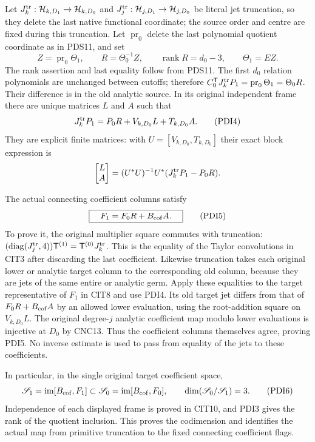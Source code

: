 \documentclass[10pt]{article}
\begin{document}
Let $J_k^{\rm tr}:\mathcal H_{k,D_1}\to\mathcal H_{k,D_0}$ and
$J_j^{\rm tr}:\mathcal H_{j,D_1}\to\mathcal H_{j,D_0}$ be literal jet
truncation, so they delete the last native functional coordinate;
the source order and centre are fixed during this truncation.
Let $\operatorname{pr}_0$ delete the last polynomial quotient
coordinate as in PDS11, and set
\[
 Z=\operatorname{pr}_0\Theta_1,\qquad
 R=\Theta_0^{-1}Z,\qquad
 \operatorname{rank}R=d_0-3,\qquad
 \Theta_1=EZ .
 \tag{PDI3}
\]
The rank assertion and last equality follow from PDS11. The
first $d_0$ relation polynomials are unchanged between cutoffs;
therefore
$C_0^{\mathsf T}J_k^{\rm tr}P_1=\operatorname{pr}_0\Theta_1=\Theta_0R$.
Their difference is in the old analytic source. In its original
independent frame there are unique matrices $L$ and $A$ such that
\[
 J_k^{\rm tr}P_1=P_0R+V_{k,D_0}L+T_{k,D_0}A .
 \tag{PDI4}
\]
They are explicit finite matrices: with
$U=[V_{k,D_0},T_{k,D_0}]$ their exact block expression is
\[
 \begin{bmatrix}L\\A\end{bmatrix}
   =(U^*U)^{-1}U^*(J_k^{\rm tr}P_1-P_0R).
\]

The actual connecting coefficient columns satisfy
\[
 \boxed{\quad F_1=F_0R+B_{\rm cof}A .\quad}
 \tag{PDI5}
\]
To prove it, the original multiplier square commutes with
truncation: $(\operatorname{diag}(J_j^{\rm tr},4))\mathsf T^{(1)}
=\mathsf T^{(0)}J_k^{\rm tr}$. This is the equality of the Taylor
convolutions in CIT3 after discarding the last coefficient.
Likewise truncation takes each original lower or analytic target
column to the corresponding old column, because they are jets of
the same entire or analytic germ. Apply these equalities to the
target representative of $F_1$ in CIT8 and use PDI4. Its old
target jet differs from that of $F_0R+B_{\rm cof}A$ by an allowed
lower evaluation, using the root-addition square on $V_{k,D_0}L$.
The original degree-$j$ analytic coefficient map modulo lower
evaluations is injective at $D_0$ by CNC13. Thus the coefficient
columns themselves agree, proving PDI5. No inverse estimate is
used to pass from equality of the jets to these coefficients.

In particular, in the single original target coefficient space,
\[
 \mathscr S_1=\operatorname{im}[B_{\rm cof},F_1]
 \subset\mathscr S_0=\operatorname{im}[B_{\rm cof},F_0],\qquad
 \dim(\mathscr S_0/\mathscr S_1)=3 .
 \tag{PDI6}
\]
Independence of each displayed frame is proved in CIT10, and
PDI3 gives the rank of the quotient inclusion. This proves the
codimension and identifies the actual map from primitive
truncation to the fixed connecting coefficient flags.
\end{document}
